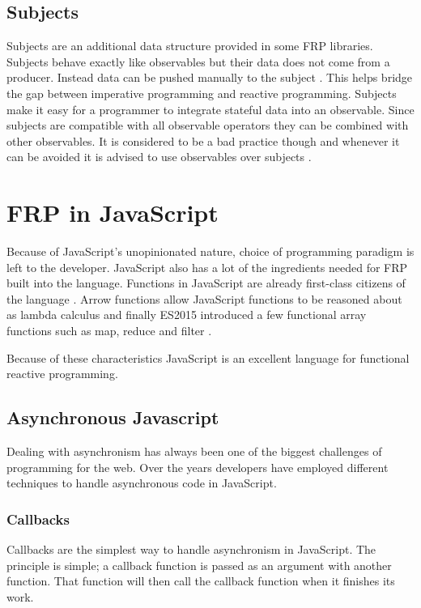\subsection{Subjects} \label{subjects}

Subjects are an additional data structure provided in some FRP libraries. Subjects behave exactly like observables but their data does not come from a producer. Instead data can be pushed manually to the subject \cite{subjects}. This helps bridge the gap between imperative programming and reactive programming. Subjects make it easy for a programmer to integrate stateful data into an observable. Since subjects are compatible with all observable operators they can be combined with other observables. It is considered to be a bad practice though and whenever it can be avoided it is advised to use observables over subjects \cite{subjects}.

\section{FRP in JavaScript}

Because of JavaScript's unopinionated nature, choice of programming paradigm is left to the developer. JavaScript also has a lot of the ingredients needed for FRP built into the language. Functions in JavaScript are already first-class citizens of the language \cite{func-js}. Arrow functions allow JavaScript functions to be reasoned about as lambda calculus and finally ES2015 introduced a few functional array functions such as map, reduce and filter \cite{es2015}.

Because of these characteristics JavaScript is an excellent language for functional reactive programming.

\subsection{Asynchronous Javascript}

Dealing with asynchronism has always been one of the biggest challenges of programming for the web. Over the years developers have employed different techniques to handle asynchronous code in JavaScript.

\subsubsection{Callbacks}

Callbacks are the simplest way to handle asynchronism in JavaScript. The principle is simple; a callback function is passed as an argument with another function. That function will then call the callback function when it finishes its work.

